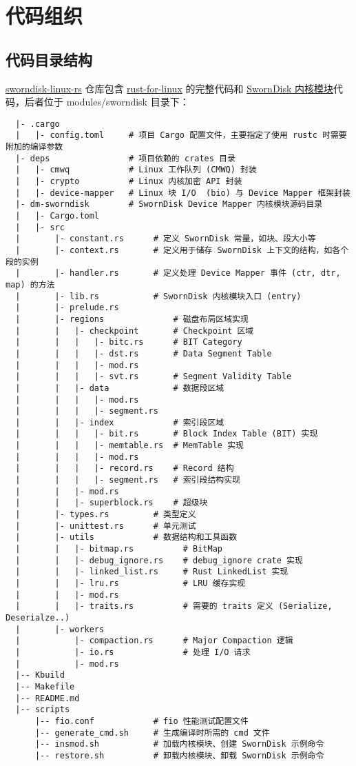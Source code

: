 \section{代码组织}

\subsection{代码目录结构}

\href{https://github.com/occlum/sworndisk-linux-rs}{sworndisk-linux-rs} 仓库包含 \href{https://github.com/Rust-for-Linux/linux}{rust-for-linux} 的完整代码和 \href{https://github.com/occlum/sworndisk-linux-rs/tree/rust/modules/sworndisk}{SwornDisk 内核模块}代码，后者位于 modules/sworndisk 目录下：

\begin{verbatim}
  |- .cargo
  |   |- config.toml     # 项目 Cargo 配置文件，主要指定了使用 rustc 时需要附加的编译参数
  |- deps                # 项目依赖的 crates 目录
  |   |- cmwq            # Linux 工作队列 (CMWQ) 封装
  |   |- crypto          # Linux 内核加密 API 封装
  |   |- device-mapper   # Linux 块 I/O  (bio) 与 Device Mapper 框架封装
  |- dm-sworndisk        # SwornDisk Device Mapper 内核模块源码目录
  |   |- Cargo.toml
  |   |- src
  |       |- constant.rs      # 定义 SwornDisk 常量，如块、段大小等
  |       |- context.rs       # 定义用于储存 SwornDisk 上下文的结构，如各个段的实例
  |       |- handler.rs       # 定义处理 Device Mapper 事件 (ctr, dtr, map) 的方法
  |       |- lib.rs           # SwornDisk 内核模块入口 (entry)
  |       |- prelude.rs
  |       |- regions              # 磁盘布局区域实现
  |       |   |- checkpoint       # Checkpoint 区域
  |       |   |   |- bitc.rs      # BIT Category
  |       |   |   |- dst.rs       # Data Segment Table
  |       |   |   |- mod.rs     
  |       |   |   |- svt.rs       # Segment Validity Table
  |       |   |- data             # 数据段区域
  |       |   |   |- mod.rs
  |       |   |   |- segment.rs
  |       |   |- index            # 索引段区域
  |       |   |   |- bit.rs       # Block Index Table (BIT) 实现
  |       |   |   |- memtable.rs  # MemTable 实现
  |       |   |   |- mod.rs
  |       |   |   |- record.rs    # Record 结构
  |       |   |   |- segment.rs   # 索引段结构实现
  |       |   |- mod.rs
  |       |   |- superblock.rs    # 超级块
  |       |- types.rs         # 类型定义
  |       |- unittest.rs      # 单元测试
  |       |- utils            # 数据结构和工具函数
  |       |   |- bitmap.rs          # BitMap
  |       |   |- debug_ignore.rs    # debug_ignore crate 实现
  |       |   |- linked_list.rs     # Rust LinkedList 实现
  |       |   |- lru.rs             # LRU 缓存实现
  |       |   |- mod.rs
  |       |   |- traits.rs          # 需要的 traits 定义 (Serialize, Deserialze..)
  |       |- workers
  |           |- compaction.rs      # Major Compaction 逻辑
  |           |- io.rs              # 处理 I/O 请求
  |           |- mod.rs
  |-- Kbuild
  |-- Makefile
  |-- README.md
  |-- scripts
      |-- fio.conf            # fio 性能测试配置文件
      |-- generate_cmd.sh     # 生成编译时所需的 cmd 文件
      |-- insmod.sh           # 加载内核模块、创建 SwornDisk 示例命令
      |-- restore.sh          # 卸载内核模块、卸载 SwornDisk 示例命令
\end{verbatim}

